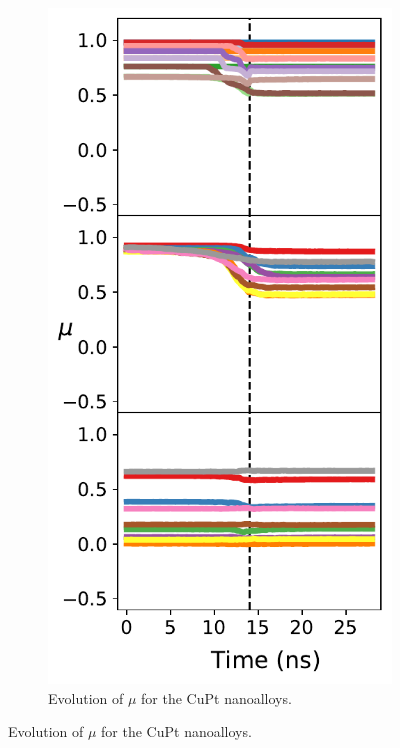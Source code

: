 \begin{figure}
    \centering
\begin{subfigure}{0.39\textwidth}
    \centering
    \smallskip
    \includegraphics[width=\linewidth]{figures/MD/Alloys/Mix_Cu-Pt.pdf}
    \caption{Evolution of $\mu$ for the CuPt nanoalloys.}

\end{subfigure}
\end{figure}
